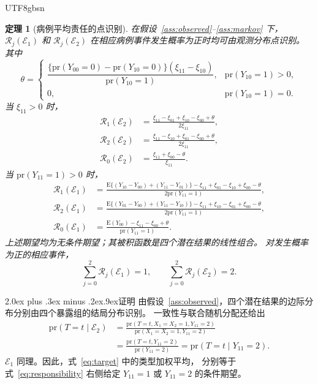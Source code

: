 \documentclass[11pt,a4paper]{article}
\makeatletter
\newcommand{\headingweight}{\ifPDFTeX\mdseries\else\bfseries\fi}
\renewcommand{\section}{\@startsection{section}{1}{0pt}
  {2.0ex plus .3ex minus .2ex}{.9ex}{\normalfont\large\headingweight}}
\theoremstyle{report}
\newtheorem{theorem}{定理}
\makeatother
\begin{document}
\begin{CJK*}{UTF8}{gbsn}
\begin{theorem}[病例平均责任的点识别]
在假设~\ref{ass:observed}--\ref{ass:markov} 下，
$\mathcal R_j(\mathcal E_1)$ 和 $\mathcal R_j(\mathcal E_2)$
在相应病例事件发生概率为正时均可由观测分布点识别。
其中
\begin{equation}
\theta=
\begin{cases}
\dfrac{\{\mathrm{pr}(Y_{00}=0)-\mathrm{pr}(Y_{10}=0)\}
       (\xi_{11}-\xi_{10})}
      {\mathrm{pr}(Y_{10}=1)},
   & \mathrm{pr}(Y_{10}=1)>0,\\[10pt]
0, & \mathrm{pr}(Y_{10}=1)=0.
\end{cases}
\label{eq:theta}
\end{equation}
当 $\xi_{11}>0$ 时，
\begin{equation}
\begin{aligned}
\mathcal R_1(\mathcal E_2)
 &=\frac{\xi_{11}-\xi_{01}+\xi_{10}-\xi_{00}+\theta}{2\xi_{11}},\\[4pt]
\mathcal R_2(\mathcal E_2)
 &=\frac{\xi_{11}-\xi_{10}+\xi_{01}-\xi_{00}+\theta}{2\xi_{11}},\\[4pt]
\mathcal R_0(\mathcal E_2)
 &=\frac{\xi_{11}+\xi_{00}-\theta}{\xi_{11}}.
\end{aligned}
\label{eq:grade2}
\end{equation}
当 $\mathrm{pr}(Y_{11}=1)>0$ 时，
\begin{equation}
\begin{aligned}
\mathcal R_1(\mathcal E_1)
 &=\frac{\mathrm E\{(Y_{10}-Y_{00})+(Y_{11}-Y_{01})\}
       -\xi_{11}+\xi_{01}-\xi_{10}+\xi_{00}-\theta}
      {2\mathrm{pr}(Y_{11}=1)},\\[4pt]
\mathcal R_2(\mathcal E_1)
 &=\frac{\mathrm E\{(Y_{01}-Y_{00})+(Y_{11}-Y_{10})\}
       -\xi_{11}+\xi_{10}-\xi_{01}+\xi_{00}-\theta}
      {2\mathrm{pr}(Y_{11}=1)},\\[4pt]
\mathcal R_0(\mathcal E_1)
 &=\frac{\mathrm E(Y_{00})-\xi_{11}-\xi_{00}+\theta}
      {\mathrm{pr}(Y_{11}=1)}.
\end{aligned}
\label{eq:grade1}
\end{equation}
上述期望均为无条件期望；其被积函数是四个潜在结果的线性组合。
对发生概率为正的相应事件，
\[
\sum_{j=0}^{2}\mathcal R_j(\mathcal E_1)=1,\qquad
\sum_{j=0}^{2}\mathcal R_j(\mathcal E_2)=2.
\]
\end{theorem}

\clearpage
\section{证明}
由假设~\ref{ass:observed}，四个潜在结果的边际分布分别由四个暴露组的结局分布识别。
一致性与联合随机分配还给出
\[
\begin{aligned}
\mathrm{pr}(T=t\mid\mathcal E_2)
 &=\frac{\mathrm{pr}(T=t,X_1=X_2=1,Y_{11}=2)}
         {\mathrm{pr}(X_1=X_2=1,Y_{11}=2)}\\
 &=\frac{\mathrm{pr}(T=t,Y_{11}=2)}{\mathrm{pr}(Y_{11}=2)}
 =\mathrm{pr}(T=t\mid Y_{11}=2).
\end{aligned}
\]
$\mathcal E_1$ 同理。因此，式~\eqref{eq:target} 中的类型加权平均，
分别等于式~\eqref{eq:responsibility} 右侧给定 $Y_{11}=1$ 或 $Y_{11}=2$ 的条件期望。


\end{CJK*}
\end{document}
